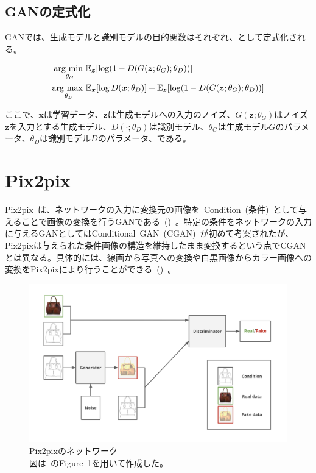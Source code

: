 \subsection{GANの定式化}

GANでは、生成モデルと識別モデルの目的関数はそれぞれ、として定式化される。

\begin{align}
    \label{eq:GAN_G}
    \mathop{\mathrm{arg~min~}}\limits _{\theta_G}& \mathbb{E}_{\boldsymbol{z}}[\log (1-D(G(\boldsymbol{z};\theta_G);\theta_D))]\\
    \label{eq:GAN_D}
    \mathop{\mathrm{arg~max~}}\limits _{\theta_D}& \mathbb{E}_{\boldsymbol{x}}[\log D(\boldsymbol{x};\theta_D)]+\mathbb{E}_{\boldsymbol{z}}[\log (1-D(G(\boldsymbol{z};\theta_G);\theta_D))]
\end{align}


ここで、$\boldsymbol{x}$は学習データ、$\boldsymbol{z}$は生成モデルへの入力のノイズ、$G(\boldsymbol{z};\theta_G)$はノイズ$\boldsymbol{z}$を入力とする生成モデル、$D(\cdot;\theta_D)$は識別モデル、$\theta_G$は生成モデル$G$のパラメータ、$\theta_D$は識別モデル$D$のパラメータ、である。

\clearpage

\section{Pix2pix}

Pix2pix~\cite{pix2pix}は、ネットワークの入力に変換元の画像を~Condition~(条件)~として与えることで画像の変換を行うGANである~()~。特定の条件をネットワークの入力に与えるGANとしてはConditional~GAN~(CGAN)~\cite{CGAN}が初めて考案されたが、Pix2pixは与えられた条件画像の構造を維持したまま変換するという点でCGANとは異なる。具体的には、線画から写真への変換や白黒画像からカラー画像への変換をPix2pixにより行うことができる~()~。

\begin{figure}[b]
\centering
\includegraphics[width=0.9\columnwidth]{figure/pix2pix_net.png}
\caption[Pix2pixのネットワーク]{Pix2pixのネットワーク\\
図は~\cite{pix2pix}のFigure~1を用いて作成した。}
\label{fig:pix2pix_net}
\end{figure}

